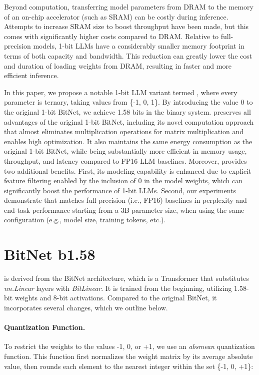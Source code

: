 Beyond computation, transferring model parameters from DRAM to the memory of an on-chip accelerator (such as SRAM) can be costly during inference. Attempts to increase SRAM size to boost throughput have been made, but this comes with significantly higher costs compared to DRAM. Relative to full-precision models, 1-bit LLMs have a considerably smaller memory footprint in terms of both capacity and bandwidth. This reduction can greatly lower the cost and duration of loading weights from DRAM, resulting in faster and more efficient inference.

In this paper, we propose a notable 1-bit LLM variant termed \textbf{}, where every parameter is ternary, taking values from \{-1, 0, 1\}. By introducing the value 0 to the original 1-bit BitNet, we achieve 1.58 bits in the binary system.  preserves all advantages of the original 1-bit BitNet, including its novel computation approach that almost eliminates multiplication operations for matrix multiplication and enables high optimization. It also maintains the same energy consumption as the original 1-bit BitNet, while being substantially more efficient in memory usage, throughput, and latency compared to FP16 LLM baselines. Moreover,  provides two additional benefits. First, its modeling capability is enhanced due to explicit feature filtering enabled by the inclusion of 0 in the model weights, which can significantly boost the performance of 1-bit LLMs. Second, our experiments demonstrate that  matches full precision (i.e., FP16) baselines in perplexity and end-task performance starting from a 3B parameter size, when using the same configuration (e.g., model size, training tokens, etc.).

\section{BitNet b1.58}

 is derived from the BitNet architecture, which is a Transformer that substitutes \emph{nn.Linear} layers with \emph{BitLinear}. It is trained from the beginning, utilizing 1.58-bit weights and 8-bit activations. Compared to the original BitNet, it incorporates several changes, which we outline below.

\paragraph{Quantization Function.} To restrict the weights to the values -1, 0, or +1, we use an \emph{absmean} quantization function. This function first normalizes the weight matrix by its average absolute value, then rounds each element to the nearest integer within the set \{-1, 0, +1\}:

